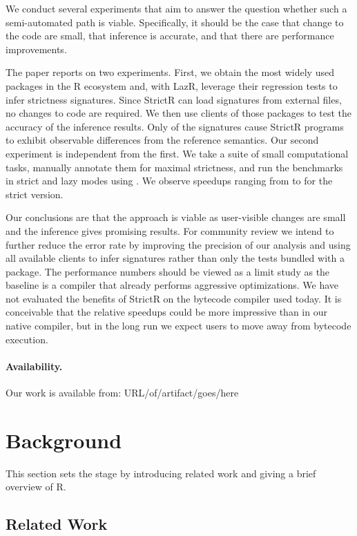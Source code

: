 \documentclass[review,creen,acmsmall]{acmart}
\newcommand{\strictr}{{\sf StrictR}\xspace}
\newcommand{\lazr}{{\sf LazR}\xspace}
\begin{document}
We conduct several experiments that aim to answer the question whether such a
semi-automated path is viable. Specifically, it should be the case that change
to the code are small, that inference is accurate, and that there are
performance improvements.

The paper reports on two experiments. First, we obtain the most widely used
packages in the R ecosystem and, with \lazr, leverage their regression tests to
infer strictness signatures. Since \strictr can load signatures from external
files, no changes to code are required. We then use clients of those packages to
test the accuracy of the inference results. Only \robustnesResult of the
signatures cause \strictr programs to exhibit observable differences from the
reference semantics. Our second experiment is independent from the first. We
take a suite of small computational tasks, manually annotate them for maximal
strictness, and run the benchmarks in strict and lazy modes using \rshstrict. We
observe speedups ranging from \speedupRshStrictMin to \speedupRshStrictMax for
the strict version.

Our conclusions are that the approach is viable as user-visible changes are
small and the inference gives promising results. For community review we intend
to further reduce the error rate by improving the precision of our analysis and
using all available clients to infer signatures rather than only the tests
bundled with a package. The performance numbers should be viewed as a limit
study as the baseline is a compiler that already performs aggressive
optimizations. We have not evaluated the benefits of \strictr on the bytecode
compiler used today. It is conceivable that the relative speedups could be more
impressive than in our native compiler, but in the long run we expect users
to move away from bytecode execution.

\paragraph{Availability.} Our work is available from:
    URL/of/artifact/goes/here

\section{Background}\label{sec:background}

This section sets the stage by introducing related work and giving a brief
overview of R.

\subsection{Related Work}
\end{document}
